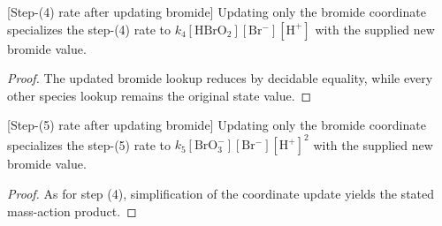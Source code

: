 \begin{lemma}

[Step-(4) rate after updating bromide]
\label{lem:chem:bz:rate4_update_bromide}
Updating only the bromide coordinate specializes the step-(4) rate to
$k_4[\mathrm{HBrO_2}][\mathrm{Br^-}][\mathrm{H^+}]$ with the supplied new
bromide value.
\end{lemma}
\begin{proof}

The updated bromide lookup reduces by decidable equality, while every other
species lookup remains the original state value.
\end{proof}

\begin{lemma}

[Step-(5) rate after updating bromide]
\label{lem:chem:bz:rate5_update_bromide}
Updating only the bromide coordinate specializes the step-(5) rate to
$k_5[\mathrm{BrO_3^-}][\mathrm{Br^-}][\mathrm{H^+}]^2$ with the supplied new
bromide value.
\end{lemma}
\begin{proof}

As for step (4), simplification of the coordinate update yields the stated
mass-action product.
\end{proof}
